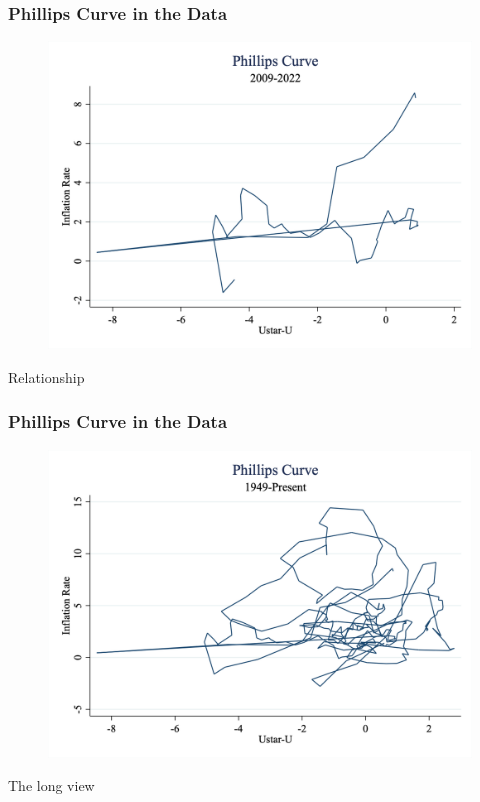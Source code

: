 \documentclass{beamer}
\begin{document}
\begin{frame}
\frametitle[alignment=center]{Phillips Curve in the Data}
\begin{figure}
\centering
\includegraphics[scale=0.25]{Figures/PhillipsCurve1.png}
\end{figure}
Relationship
\end{frame}

\begin{frame}
\frametitle[alignment=center]{Phillips Curve in the Data}
\begin{figure}
\centering
\includegraphics[scale=0.25]{Figures/PhillipsCurve2.png}
\end{figure}
The long view
\end{frame}
\end{document}
